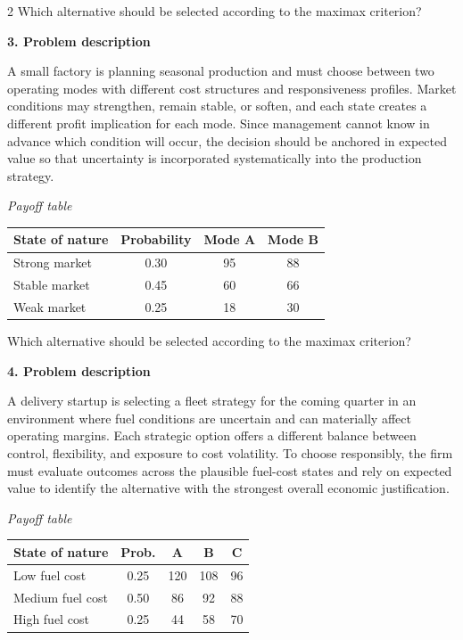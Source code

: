 \documentclass[12pt]{article}
\newcommand{\SubsectionBox}[1]{%
	\noindent\colorbox{gray!30}{%
		\parbox{\linewidth}{\textbf{#1}}%
	}\par\vspace{0.35cm}%
}
\begin{document}
\begin{multicols}{2}
				Which alternative should be selected according to the maximax criterion?

		\vspace{0.25cm}
		\SubsectionBox{3. Problem description}\vspace{-0.25cm}
		A small factory is planning seasonal production and must choose between two operating modes with different cost structures and responsiveness profiles. Market conditions may strengthen, remain stable, or soften, and each state creates a different profit implication for each mode. Since management cannot know in advance which condition will occur, the decision should be anchored in expected value so that uncertainty is incorporated systematically into the production strategy.
		
				\begin{center}
					\textit{Payoff table} \par
					\begin{tabular}{l c c c}
						\toprule
						State of nature & Probability & Mode A & Mode B \\
						\midrule
						Strong market & 0.30 & 95 & 88 \\
						Stable market & 0.45 & 60 & 66 \\
						Weak market & 0.25 & 18 & 30 \\
						\bottomrule
					\end{tabular}
				\end{center}
		
				Which alternative should be selected according to the maximax criterion?

		\vspace{0.25cm}
		\SubsectionBox{4. Problem description}\vspace{-0.25cm}
		A delivery startup is selecting a fleet strategy for the coming quarter in an environment where fuel conditions are uncertain and can materially affect operating margins. Each strategic option offers a different balance between control, flexibility, and exposure to cost volatility. To choose responsibly, the firm must evaluate outcomes across the plausible fuel-cost states and rely on expected value to identify the alternative with the strongest overall economic justification.
		
				\begin{center}
					\textit{Payoff table} \par
					\begin{tabular}{l c c c c}
						\toprule
						State of nature & Prob. & A & B & C \\
						\midrule
						Low fuel cost & 0.25 & 120 & 108 & 96 \\
						Medium fuel cost & 0.50 & 86 & 92 & 88 \\
						High fuel cost & 0.25 & 44 & 58 & 70 \\
						\bottomrule
					\end{tabular}
				\end{center}
		

\end{multicols}
\end{document}
